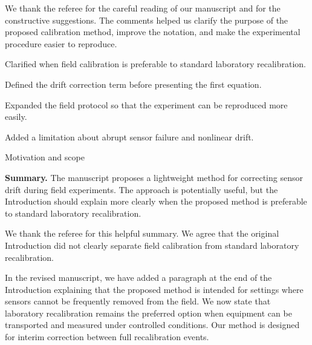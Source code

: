 We thank the referee for the careful reading of our manuscript and for the constructive suggestions. The comments helped us clarify the purpose of the proposed calibration method, improve the notation, and make the experimental procedure easier to reproduce.

\begin{revisionsummary}
\item Clarified when field calibration is preferable to standard laboratory recalibration.
\item Defined the drift correction term before presenting the first equation.
\item Expanded the field protocol so that the experiment can be reproduced more easily.
\item Added a limitation about abrupt sensor failure and nonlinear drift.
\end{revisionsummary}


\begin{replypoint}[Revised]{Motivation and scope}
\begin{refereecomment}
\textbf{Summary.} The manuscript proposes a lightweight method for correcting sensor drift during field experiments. The approach is potentially useful, but the Introduction should explain more clearly when the proposed method is preferable to standard laboratory recalibration.
\end{refereecomment}

\begin{authorreply}
We thank the referee for this helpful summary. We agree that the original Introduction did not clearly separate field calibration from standard laboratory recalibration.

In the revised manuscript, we have added a paragraph at the end of the Introduction explaining that the proposed method is intended for settings where sensors cannot be frequently removed from the field. We now state that laboratory recalibration remains the preferred option when equipment can be transported and measured under controlled conditions. Our method is designed for interim correction between full recalibration events.

\end{authorreply}
\end{replypoint}

